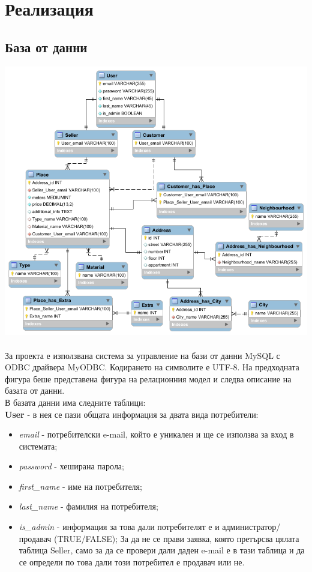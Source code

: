 \documentclass[a4paper,12pt, leqno]{article}
\begin{document}
  \section{Реализация}
    \subsection{База от данни}

\includegraphics[width=175mm]{diagram.png}
\\
\\
За проекта е използвана система за управление на бази от данни MySQL с ODBC драйвера MyODBC. Кодирането на
символите е UTF-8. На предходната фигура беше представена фигура на релационния модел и следва описание на 
базата от данни.
\\
В базата данни има следните таблици:
\\

\textbf{User} - в нея се пази общата информация за двата вида потребители:
\begin{itemize}
 \item \textit{email} - потребителски e-mail, който е уникален и ще се използва за вход в системата;
 \item \textit{password} - хеширана парола;
 \item \textit{first\_name} - име на потребителя;
 \item \textit{last\_name} - фамилия на потребителя;
 \item \textit{is\_admin} - информация за това дали потребителят е и администратор/продавач (TRUE/FALSE); За да не се прави
заявка, която претърсва цялата таблица Seller, само за да се провери дали даден e-mail е в тази таблица и да се определи
по това дали този потребител е продавач или не.
\end{itemize}
\end{document}
